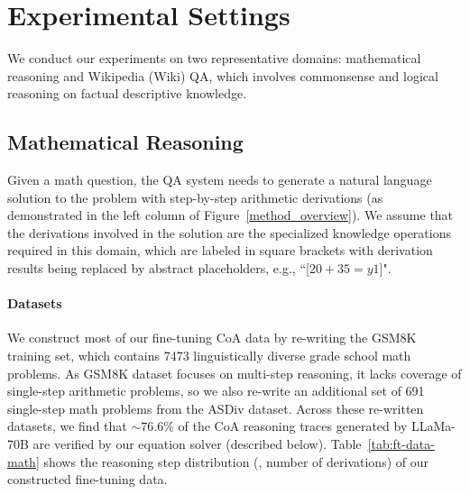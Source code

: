 \section{Experimental Settings}
We conduct our experiments on two representative domains: mathematical reasoning and Wikipedia (Wiki) QA, which involves commonsense and logical reasoning on factual descriptive knowledge.

\subsection{Mathematical Reasoning}
\label{ss:math}
Given a math question, the QA system needs to generate a natural language solution to the problem with step-by-step arithmetic derivations (as demonstrated in the left column of Figure~\ref{method_overview}).
We assume that the derivations involved in the solution are the specialized knowledge operations required in this domain, which are labeled in square brackets with derivation results being replaced by abstract placeholders, e.g., ``[$20 + 35 = y1$]".

\paragraph{Datasets}
We construct most of our fine-tuning CoA data by re-writing the GSM8K \citep{cobbe2021training} training set, which contains 7473 linguistically diverse grade school math problems.
As GSM8K dataset focuses on multi-step reasoning, it lacks coverage of single-step arithmetic problems, so we also re-write an additional set of 691 single-step math problems from the ASDiv \citep{miao2020diverse} dataset.
Across these re-written datasets, we find that $\sim76.6\%$ of the CoA reasoning traces generated by LLaMa-70B are verified by our equation solver (described below). 
Table~\ref{tab:ft-data-math} shows the reasoning step distribution (\ie{}, number of derivations) of our constructed fine-tuning data.

\begin{table}[t]
\centering
{}
\caption{Reasoning step distribution of correctly re-written reasoning chains in math domain.}
\label{tab:ft-data-math}
\end{table}

